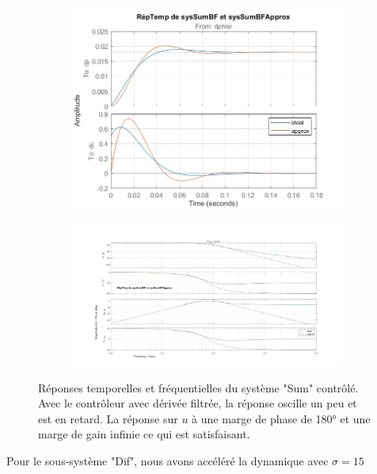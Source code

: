 \documentclass{report}
\begin{document}
\begin{figure}[h]  %
    \begin{subfigure}{.4\textwidth}
        \centering
        \includegraphics[width=\textwidth]{figures/reptempsumbf_approx.jpg}        
      \end{subfigure}    
      \begin{subfigure}{.6\textwidth}
        \centering
        \includegraphics[width=\textwidth]{figures/repfreqsumbf_approx.jpg}
      \end{subfigure}    
      \caption{Réponses temporelles et fréquentielles 
      du système "Sum" contrôlé.
      Avec le contrôleur avec dérivée filtrée, la 
      réponse oscille un peu et est en retard.
      La réponse sur $u$ à une marge de phase de 180° et une 
      marge de gain infinie ce qui est satisfaisant.}
\end{figure}

Pour le sous-système "Dif", nous avons accéléré la dynamique avec
$\sigma = 15$
\end{document}
